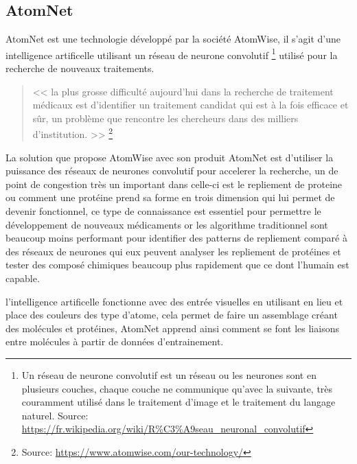         \subsection*{AtomNet}
            AtomNet est une technologie développé par la société AtomWise,
            il s'agit d'une intelligence artificelle utilisant un réseau de neurone convolutif
            \footnote{Un réseau de neurone convolutif est un réseau ou les neurones sont en plusieurs 
            couches, chaque couche ne communique qu'avec la suivante, très couramment utilisé dans le
            traitement d'image et le traitement du langage naturel.
            Source: \url{https://fr.wikipedia.org/wiki/R\%C3\%A9seau_neuronal_convolutif}}
            utilisé pour la recherche de nouveaux traitements.
           \begin{quote}
            << la plus grosse difficulté aujourd'hui dans la recherche de traitement médicaux 
            est d'identifier un traitement candidat qui est à la fois efficace et sûr, un problème 
            que rencontre les chercheurs dans des milliers d'institution. >> 
            \footnote{Source: \url{https://www.atomwise.com/our-technology/}}
            \end{quote}
            La solution que propose AtomWise avec son produit AtomNet est d'utiliser la puissance 
            des réseaux de neurones convolutif pour accelerer la recherche, un de point de congestion
            très un important dans celle-ci est le repliement de proteine ou comment une protéine 
            prend sa forme en trois dimension qui lui permet de devenir fonctionnel, ce type de connaissance 
            est essentiel pour permettre le développement de nouveaux médicaments or les 
            algorithme traditionnel sont beaucoup moins performant pour identifier des patterns
            de repliement comparé à des réseaux de neurones qui eux peuvent analyser les repliement 
            de protéines et tester des composé chimiques beaucoup plus rapidement que ce dont 
            l'humain est capable. \newline 

            l'intelligence artificelle fonctionne avec des entrée visuelles en utilisant en lieu et place 
            des couleurs des type d'atome, cela permet de faire un assemblage créant des molécules et 
            protéines, AtomNet apprend ainsi comment se font les liaisons entre molécules à partir de 
            données d'entrainement. \newline
            \newpage

